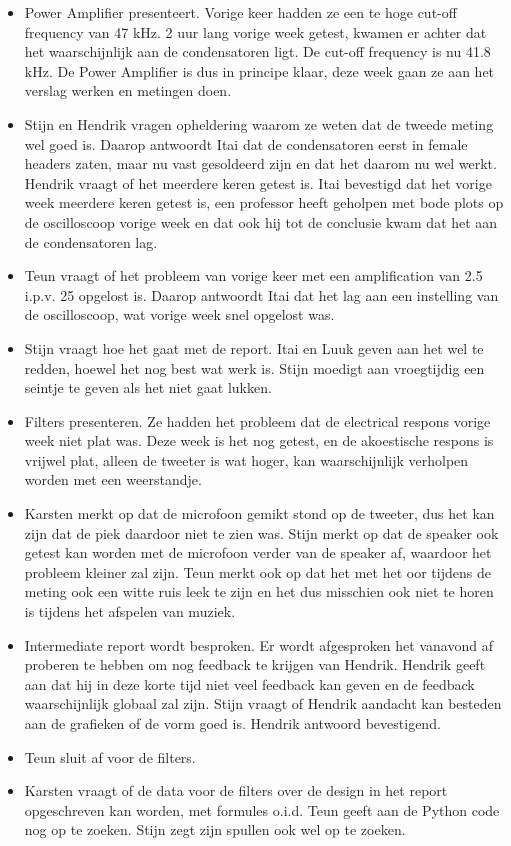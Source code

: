 \begin{enumerate}
\begin{itemize}
        \item Power Amplifier presenteert. Vorige keer hadden ze een te hoge cut-off frequency van 47 kHz. 2 uur lang vorige week getest, kwamen er achter dat het waarschijnlijk aan de condensatoren ligt. De cut-off frequency is nu 41.8 kHz. De Power Amplifier is dus in principe klaar, deze week gaan ze aan het verslag werken en metingen doen.
        \item Stijn en Hendrik vragen opheldering waarom ze weten dat de tweede meting wel goed is. Daarop antwoordt Itai dat de condensatoren eerst in female headers zaten, maar nu vast gesoldeerd zijn en dat het daarom nu wel werkt. Hendrik vraagt of het meerdere keren getest is. Itai bevestigd dat het vorige week meerdere keren getest is, een professor heeft geholpen met bode plots op de oscilloscoop vorige week en dat ook hij tot de conclusie kwam dat het aan de condensatoren lag.
        \item Teun vraagt of het probleem van vorige keer met een amplification van 2.5 i.p.v. 25 opgelost is. Daarop antwoordt Itai dat het lag aan een instelling van de oscilloscoop, wat vorige week snel opgelost was. 
        \item Stijn vraagt hoe het gaat met de report. Itai en Luuk geven aan het wel te redden, hoewel het nog best wat werk is. Stijn moedigt aan vroegtijdig een seintje te geven als het niet gaat lukken.
        \item Filters presenteren. Ze hadden het probleem dat de electrical respons vorige week niet plat was. Deze week is het nog getest, en de akoestische respons is vrijwel plat, alleen de tweeter is wat hoger, kan waarschijnlijk verholpen worden met een weerstandje. 
        \item Karsten merkt op dat de microfoon gemikt stond op de tweeter, dus het kan zijn dat de piek daardoor niet te zien was. Stijn merkt op dat de speaker ook getest kan worden met de microfoon verder van de speaker af, waardoor het probleem kleiner zal zijn. Teun merkt ook op dat het met het oor tijdens de meting ook een witte ruis leek te zijn en het dus misschien ook niet te horen is tijdens het afspelen van muziek.
        \item Intermediate report wordt besproken. Er wordt afgesproken het vanavond af proberen te hebben om nog feedback te krijgen van Hendrik. Hendrik geeft aan dat hij in deze korte tijd niet veel feedback kan geven en de feedback waarschijnlijk globaal zal zijn. Stijn vraagt of Hendrik aandacht kan besteden aan de grafieken of de vorm goed is. Hendrik antwoord bevestigend. 
        \item Teun sluit af voor de filters.
        \item Karsten vraagt of de data voor de filters over de design in het report opgeschreven kan worden, met formules o.i.d. Teun geeft aan de Python code nog op te zoeken. Stijn zegt zijn spullen ook wel op te zoeken. 
    \end{itemize}


\end{enumerate}
